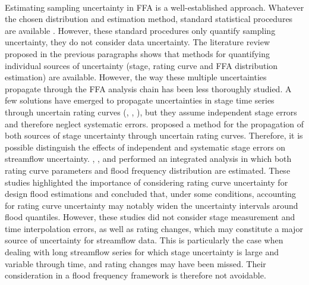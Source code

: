 \documentclass[11pt]{article}
\begin{document}
    \paragraph{}
    Estimating sampling uncertainty in FFA is a well-established approach. Whatever the chosen distribution and estimation method, standard statistical procedures are available \citep{coles_classical_2001}. However, these standard procedures only quantify sampling uncertainty, they do not consider data uncertainty. The literature review proposed in the previous paragraphs shows that methods for quantifying individual sources of uncertainty (stage, rating curve and FFA distribution estimation) are available. However, the way these multiple uncertainties propagate through the FFA analysis chain has been less thoroughly studied. A few solutions have emerged to propagate uncertainties in stage time series through uncertain rating curves (\citet{dymond_accuracy_1982}, \citet{herschy_hydrometry_1998}, \citet{petersen-overleir_uncertainty_2005}), but they assume independent stage errors and therefore neglect systematic errors. \citet{horner_impact_2018} proposed a method for the propagation of both sources of stage uncertainty through uncertain rating curves. Therefore, it is possible distinguish the effects of independent and systematic stage errors on streamflow uncertainty. \citet{petersen-overleir_accounting_2009}, \citet{steinbakk_propagation_2016}, and \citet{vieira_assessing_2022} performed an integrated analysis in which both rating curve parameters and flood frequency distribution are estimated. These studies highlighted the importance of considering rating curve uncertainty for design flood estimations and concluded that, under some conditions, accounting for rating curve uncertainty may notably widen the uncertainty intervals around flood quantiles. However, these studies did not consider stage measurement and time interpolation errors, as well as rating changes, which may constitute a major source of uncertainty for streamflow data. This is particularly the case when dealing with long streamflow series for which stage uncertainty is large and variable through time, and rating changes may have been missed. Their consideration in a flood frequency framework is therefore not avoidable. 
        
\end{document}
